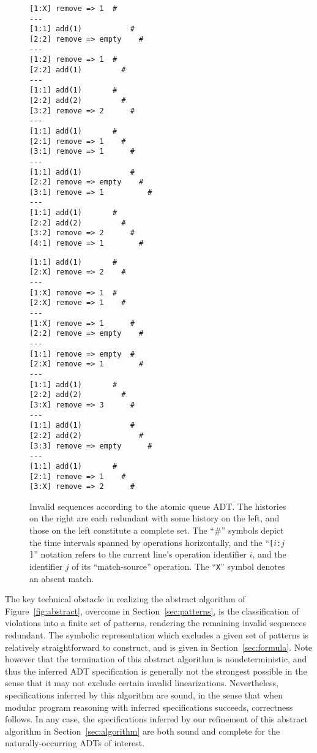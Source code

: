 \begin{figure}[t]
  \begin{minipage}[b]{0.49\linewidth}
    \begin{verbatim}
[1:X] remove => 1  #
---
[1:1] add(1)           #
[2:2] remove => empty    #
---
[1:2] remove => 1  #
[2:2] add(1)         #
---
[1:1] add(1)       #
[2:2] add(2)         #
[3:2] remove => 2      #
---
[1:1] add(1)       #
[2:1] remove => 1    #
[3:1] remove => 1      #
---
[1:1] add(1)           #
[2:2] remove => empty    #
[3:1] remove => 1          #
---
[1:1] add(1)       #
[2:2] add(2)         #
[3:2] remove => 2      #
[4:1] remove => 1        #
    \end{verbatim}
  \end{minipage}
  \hfill
  \begin{minipage}[b]{0.49\linewidth}
    \begin{verbatim}
[1:1] add(1)       #
[2:X] remove => 2    #
---
[1:X] remove => 1  #
[2:X] remove => 1    #
---
[1:X] remove => 1      #
[2:2] remove => empty    #
---
[1:1] remove => empty  #
[2:X] remove => 1        #
---
[1:1] add(1)       #
[2:2] add(2)         #
[3:X] remove => 3      #
---
[1:1] add(1)           #
[2:2] add(2)             #
[3:3] remove => empty      #
---
[1:1] add(1)       #
[2:1] remove => 1    #
[3:X] remove => 2      #
    \end{verbatim}
  \end{minipage}
  \caption{Invalid sequences according to the atomic queue ADT. The histories
  on the right are each redundant with some history on the left, and those on
  the left constitute a complete set. The “\#” symbols depict the time intervals
  spanned by operations horizontally, and the “{\tt [$i$:$j$]}” notation refers
  to the current line’s operation identifier $i$, and the identifier $j$ of
  its “match-source” operation. The “{\tt X}” symbol denotes an absent match.}
  \label{fig:patterns}
\end{figure}

The key technical obstacle in realizing the abstract algorithm of
Figure~\ref{fig:abstract}, overcome in Section~\ref{sec:patterns}, is the
classification of violations into a finite set of patterns, rendering the
remaining invalid sequences redundant. The symbolic representation which
excludes a given set of patterns is relatively straightforward to construct, and
is given in Section~\ref{sec:formula}. Note however that the termination of this
abstract algorithm is nondeterministic, and thus the inferred ADT specification
is generally not the strongest possible in the sense that it may not exclude
certain invalid linearizations. Nevertheless, specifications inferred by this
algorithm are sound, in the sense that when modular program reasoning with
inferred specifications succeeds, correctness follows. In any case, the
specifications inferred by our refinement of this abstract algorithm in
Section~\ref{sec:algorithm} are both sound and complete for the
naturally-occurring ADTs of interest.
